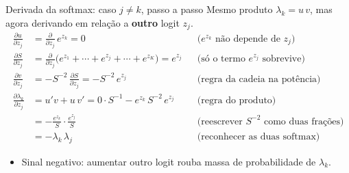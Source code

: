 \documentclass[aspectratio=169,xcolor=dvipsnames]{beamer}
\begin{document}
  \begin{frame}{Derivada da softmax: caso $j \ne k$, passo a passo}
    Mesmo produto $\lambda_k = u\,v$, mas agora derivando em relação a \textbf{outro} logit $z_j$.
    \begin{align*}
      \frac{\partial u}{\partial z_j} &= \frac{\partial}{\partial z_j}\,e^{z_k} = 0
        &&\text{($e^{z_k}$ não depende de $z_j$)} \\
      \frac{\partial S}{\partial z_j} &= \frac{\partial}{\partial z_j}\big(e^{z_1}+\cdots+e^{z_j}+\cdots+e^{z_K}\big) = e^{z_j}
        &&\text{(só o termo $e^{z_j}$ sobrevive)} \\
      \frac{\partial v}{\partial z_j} &= -S^{-2}\,\frac{\partial S}{\partial z_j} = -S^{-2}\,e^{z_j}
        &&\text{(regra da cadeia na potência)} \\[0.4em]
      \frac{\partial \lambda_k}{\partial z_j}
        &= u'v + u\,v'
         = 0\cdot S^{-1} - e^{z_k}\,S^{-2}\,e^{z_j}
        &&\text{(regra do produto)} \\
        &= -\frac{e^{z_k}}{S}\cdot\frac{e^{z_j}}{S}
        &&\text{(reescrever $S^{-2}$ como duas frações)} \\
        &= -\lambda_k\,\lambda_j
        &&\text{(reconhecer as duas softmax)}
    \end{align*}
    \vspace{-0.7em}
    \begin{itemize}
      \item Sinal negativo: aumentar outro logit \alert{rouba} massa de probabilidade de $\lambda_k$.
    \end{itemize}
  \end{frame}
\end{document}
